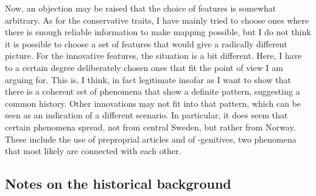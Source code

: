 Now, an objection may be raised that the choice of features is somewhat arbitrary. As for the conservative traits, I have mainly tried to choose ones where there is enough reliable information to make mapping possible, but I do not think it is possible to choose a set of features that would give a radically different picture. For the innovative features, the situation is a bit different. Here, I have to a certain degree deliberately chosen ones that fit the point of view I am arguing for. This is, I think, in fact legitimate insofar as I want to show that there is a coherent set of phenomena that show a definite pattern, suggesting a common history. Other innovations may not fit into that pattern, which can be seen as an indication of a different scenario. In particular, it does seem that certain phenomena spread, not from central Sweden, but rather from Norway. These include the use of preproprial articles and of -genitives, two phenomena that most likely are connected with each other. 

\subsection[Notes on the historical background]{\rmfamily Notes on the historical background}
